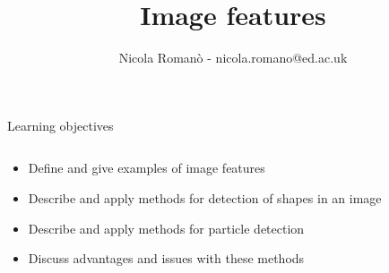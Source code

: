\documentclass[9pt, aspectratio=169]{beamer}
\author{Nicola Roman\`o - nicola.romano@ed.ac.uk}
\title{Image features}
\date{}
\begin{document}

\begin{frame}
    \titlepage
\end{frame}

\begin{frame}
    {Learning objectives}
    \begin{columns}
        \begin{column}{0.8\textwidth}
            \begin{itemize}
                \item Define and give examples of image features
                \item Describe and apply methods for detection of shapes in an image
                \item Describe and apply methods for particle detection
                \item Discuss advantages and issues with these methods
            \end{itemize}
        \end{column}
        \begin{column}{0.2\textwidth}

\end{column}
\end{columns}
\end{frame}
\end{document}
